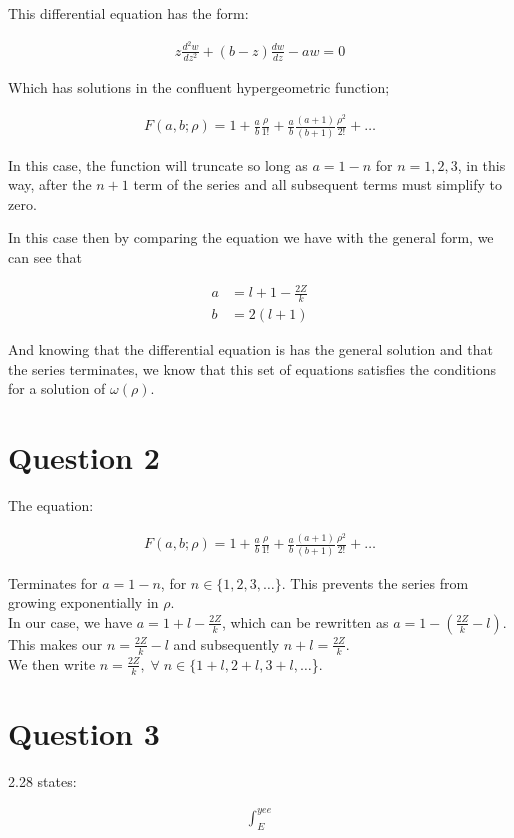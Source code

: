 \documentclass{article}
\begin{document}
    This differential equation has the form:

    \begin{gather}
        z\frac{d^2w}{dz^2} + (b-z)\frac{dw}{dz} - aw = 0
    \end{gather}

    Which has solutions in the confluent hypergeometric function;

    \begin{gather}
        F(a,b;\rho) = 1 + \frac{a}{b}\frac{\rho}{1!} + \frac{a}{b}\frac{(a+1)}{(b+1)}\frac{\rho^2}{2!} + \dots
    \end{gather}
    
    In this case, the function will truncate so long as $a=1-n$ for $n=1,2,3$,
    in this way, after the $n+1$ term of the series and all subsequent terms must simplify to zero.

    In this case then by comparing the equation we have with the general form, we can see that

    \begin{align}
        a &= l+1 - \frac{2Z}{k}\\
        b &= 2(l+1)
    \end{align}

    And knowing that the differential equation is has the general solution and that the series terminates, we know that this set of
    equations satisfies the conditions for a solution of $\omega(\rho)$.



\section{Question 2}

    The equation:

    \begin{gather}
        F(a,b;\rho) = 1 + \frac{a}{b}\frac{\rho}{1!} + \frac{a}{b}\frac{(a+1)}{(b+1)}\frac{\rho^2}{2!} + \dots
    \end{gather}

    Terminates for $a = 1 - n$, for $n \in \{1,2,3,\dots\}$. 
    This prevents the series from growing exponentially in $\rho$.\\

    In our case, we have $a = 1 + l - \frac{2Z}{k}$, which can be rewritten as $a = 1 - (\frac{2Z}{k}-l)$.\\
    This makes our $n = \frac{2Z}{k}-l$ and subsequently $n+l=\frac{2Z}{k}$.\\ 
    \smallskip
    We then write $n=\frac{2Z}{k}, \;\forall\; n \in \{1 + l, 2 + l, 3 + l, \dots$\}.\\

\section{Question 3}

    2.28 states:

    \begin{gather}
        \int_{E}^{yee}
    \end{gather}
    
\end{document}
